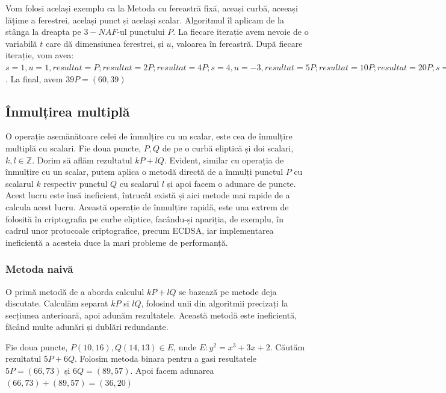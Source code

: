 \begin{ex}
Vom folosi același exemplu ca la Metoda cu fereastră fixă, aceași curbă, aceeași lățime a ferestrei, același punct și același scalar. Algoritmul îl aplicam de la stânga la dreapta pe $3-NAF$-ul punctului $P$. La fiecare iterație avem nevoie de o variabilă $t$ care dă dimensiunea ferestrei, și $u$, valoarea în fereastră. După fiecare iterație, vom avea: $s=1, u=1, resultat=P; resultat = 2P; resultat = 4P; s=4, u=-3, resultat = 5P; resultat = 10P; resultat = 20P; s=6, u=-1, resultat=39P$. La final, avem $39P = (60, 39)$
\end{ex}

\subsection{Înmulțirea multiplă}

\begin{dfn}
O operație asemănătoare celei de înmulțire cu un scalar, este cea de înmulțire multiplă cu scalari. Fie doua puncte, $P, Q$ de pe o curbă eliptică și doi scalari, $k, l\in \mathbb{Z}$. Dorim să aflăm rezultatul $kP + lQ$. Evident, similar cu operația de înmulțire cu un scalar, putem aplica o metodă directă de a înmulți punctul $P$ cu scalarul $k$ respectiv punctul $Q$ cu scalarul $l$ și apoi facem o adunare de puncte. Acest lucru este însă ineficient, întrucât există și aici metode mai rapide de a calcula acest lucru. Această operație de înmulțire rapidă, este una extrem de folosită în criptografia pe curbe eliptice, facându-și apariția, de exemplu, în cadrul unor protocoale criptografice, precum ECDSA, iar implementarea ineficientă a acesteia duce la mari probleme de performanță. 
\end{dfn}

\subsubsection{Metoda naivă}
O primă metodă de a aborda calculul $kP + lQ$ se bazează pe metode deja discutate. Calculăm separat $kP$ si $lQ$, folosind unii din algoritmii precizați la secțiunea anterioară, apoi adunăm rezultatele. Această metodă este ineficientă, făcând multe adunări și dublări redundante.
\begin{ex}
Fie doua puncte, $P(10, 16), Q(14, 13)\in E$, unde $E: y^2 = x^3 + 3x + 2$. Căutăm rezultatul $5P + 6Q$. Folosim metoda binara pentru a gasi resultatele $5P = (66, 73)$ și
$6Q = (89, 57)$. Apoi facem adunarea $(66, 73) + (89, 57) = (36, 20)$
\end{ex}

